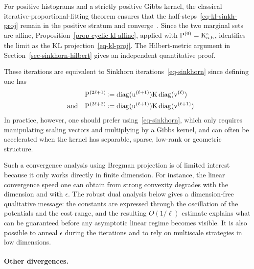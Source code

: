 For positive histograms and a strictly positive Gibbs kernel, the classical iterative-proportional-fitting theorem ensures that the half-steps~\eqref{eq-kl-sinkh-proj} remain in the positive stratum and converge~\cite{Ruschendorf95,RuschendorfThomsen}. Since the two marginal sets are affine, Proposition~\ref{prop-cyclic-kl-affine}, applied with $\mathrm{P}^{(0)}=\mathrm{K}_{\mathrm{a},\mathrm{b}}^\varepsilon$, identifies the limit as the KL projection~\eqref{eq-kl-proj}. The Hilbert-metric argument in Section~\ref{sec-sinkhorn-hilbert} gives an independent quantitative proof.

These iterations are equivalent to Sinkhorn iterations~\eqref{eq-sinkhorn} since defining
\eq{\label{eq-sink-matrix}\P^{(2\ell)} \eqdef \diag(\it{\uD}) \K \diag(\it{\vD}),}
one has
\begin{align*}
	\mathrm{P}^{(2\ell+1)} &\coloneqq \operatorname{diag}(\mathrm{u}^{(\ell+1)}) \mathrm{K} \operatorname{diag}(\mathrm{v}^{(\ell)}) \\
	\quad \text{and} \quad
	\mathrm{P}^{(2\ell+2)} &\coloneqq \operatorname{diag}(\mathrm{u}^{(\ell+1)}) \mathrm{K} \operatorname{diag}(\mathrm{v}^{(\ell+1)})
\end{align*}
In practice, however, one should prefer using~\eqref{eq-sinkhorn}, which only requires manipulating scaling vectors and multiplying by a Gibbs kernel, and can often be accelerated when the kernel has separable, sparse, low-rank or geometric structure.

Such a convergence analysis using Bregman projection is of limited interest because it only works directly in finite dimension. For instance, the linear convergence speed one can obtain from strong convexity degrades with the dimension and with $\epsilon$. The robust dual analysis below gives a dimension-free qualitative message: the constants are expressed through the oscillation of the potentials and the cost range, and the resulting $O(1/\ell)$ estimate explains what can be guaranteed before any asymptotic linear regime becomes visible.
%
It is also possible to anneal $\epsilon$ during the iterations and to rely on multiscale strategies in low dimensions.

\paragraph{Other divergences.}

